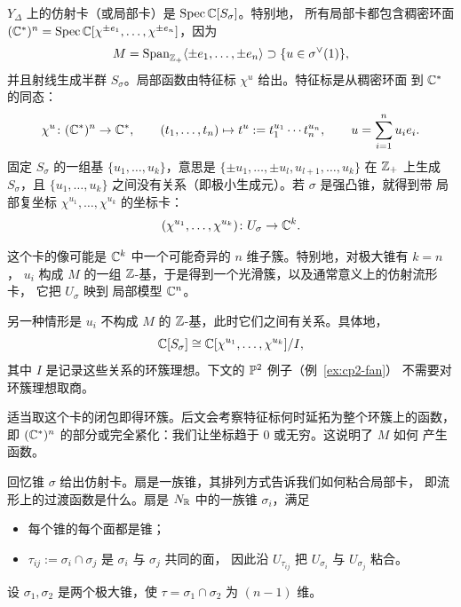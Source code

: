 \begin{definition}[仿射卡与函数]\label{def:affine-chart}
$Y_\Delta$ 上的仿射卡（或局部卡）是 $\operatorname{Spec}\mathbb{C}[S_\sigma]$。特别地，
所有局部卡都包含稠密环面
$(\mathbb{C}^*)^n = \operatorname{Spec}\mathbb{C}[\chi^{\pm e_1},\dots,\chi^{\pm e_n}]$，因为
\[
M = \operatorname{Span}_{\mathbb{Z}_+}\langle \pm e_1,\dots,\pm e_n\rangle
\supset \{u\in\sigma^\vee(1)\},
\]
并且射线生成半群 $S_\sigma$。局部函数由特征标 $\chi^u$ 给出。特征标是从稠密环面
到 $\mathbb{C}^*$ 的同态：
\[
\chi^u\colon(\mathbb{C}^*)^n\to\mathbb{C}^*,\qquad
(t_1,\dots,t_n)\mapsto t^u := t_1^{u_1}\cdots t_n^{u_n},\qquad
u = \sum_{i=1}^n u_i e_i.
\]
固定 $S_\sigma$ 的一组基 $\{u_1,\dots,u_k\}$，意思是
$\{\pm u_1,\dots,\pm u_l,u_{l+1},\dots,u_k\}$ 在 $\mathbb{Z}_+$ 上生成 $S_\sigma$，且
$\{u_1,\dots,u_k\}$ 之间没有关系（即极小生成元）。若 $\sigma$ 是强凸锥，就得到带
局部复坐标 $\chi^{u_1},\dots,\chi^{u_k}$ 的坐标卡：
\[
(\chi^{u_1},\dots,\chi^{u_k})\colon U_\sigma\to\mathbb{C}^k.
\]
\end{definition}


\begin{remark}
这个卡的像可能是 $\mathbb{C}^k$ 中一个可能奇异的 $n$ 维子簇。特别地，对极大锥有 $k=n$，
$u_i$ 构成 $M$ 的一组 $\mathbb{Z}$-基，于是得到一个光滑簇，以及通常意义上的仿射流形卡，
它把 $U_\sigma$ 映到
局部模型 $\mathbb{C}^n$。

另一种情形是 $u_i$ 不构成 $M$ 的 $\mathbb{Z}$-基，此时它们之间有关系。具体地，
\[
\mathbb{C}[S_\sigma]\cong \mathbb{C}[\chi^{u_1},\dots,\chi^{u_k}]/I,
\]
其中 $I$ 是记录这些关系的环簇理想。下文的 $\mathbb{P}^2$ 例子（例~\ref{ex:cp2-fan}）
不需要对环簇理想取商。

适当取这个卡的闭包即得环簇。后文会考察特征标何时延拓为整个环簇上的函数，
即 $(\mathbb{C}^*)^n$ 的部分或完全紧化：我们让坐标趋于 $0$ 或无穷。这说明了 $M$ 如何
产生函数。
\end{remark}

\begin{definition}[环簇]\label{def:toric-variety}
回忆锥 $\sigma$ 给出仿射卡。扇是一族锥，其排列方式告诉我们如何粘合局部卡，
即流形上的过渡函数是什么。扇是 $N_{\mathbb{R}}$ 中的一族锥 $\sigma_i$，满足
\begin{itemize}[leftmargin=2.2em,itemsep=0.25em]
\item 每个锥的每个面都是锥；
\item $\tau_{ij} := \sigma_i\cap\sigma_j$ 是 $\sigma_i$ 与 $\sigma_j$ 共同的面，
  因此沿 $U_{\tau_{ij}}$ 把 $U_{\sigma_i}$ 与 $U_{\sigma_j}$ 粘合。
\end{itemize}
设 $\sigma_1,\sigma_2$ 是两个极大锥，使 $\tau = \sigma_1\cap\sigma_2$ 为 $(n-1)$ 维。
\end{definition}

